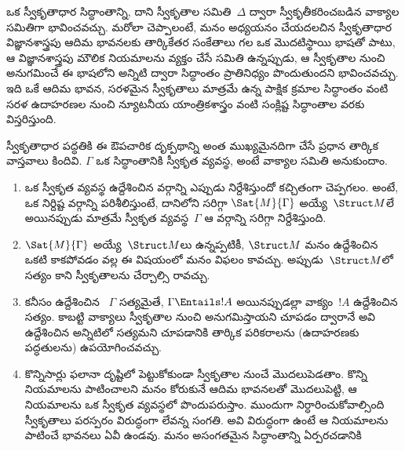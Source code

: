\documentclass[../../../include/open-logic-section]{subfiles}
\begin{document}
\begin{explain}
ఒక స్వీకృతాధార సిద్ధాంతాన్ని, దాని స్వీకృతాల సమితి~$\Delta$ ద్వారా
స్వీకృతీకరించబడిన వాక్యాల సమితిగా భావించవచ్చు. మరోలా చెప్పాలంటే, మనం
అధ్యయనం చేయదలచిన స్వీకృతాధార విజ్ఞానశాస్త్రపు ఆదిమ భావనలకు తార్కికేతర
సంకేతాలు గల ఒక మొదటిస్థాయి భాషతో పాటు, ఆ విజ్ఞానశాస్త్రపు మౌలిక నియమాలను
వ్యక్తం చేసే  సమితి ఉన్నప్పుడు, ఆ స్వీకృతాల నుంచి అనుగమించే ఈ
భాషలోని  అన్నిటి ద్వారా సిద్ధాంతం ప్రాతినిధ్యం పొందుతుందని
భావించవచ్చు. ఇది ఒకే ఆదిమ భావన, సరళమైన స్వీకృతాలు మాత్రమే ఉన్న పాక్షిక
క్రమాల సిద్ధాంతం వంటి సరళ ఉదాహరణల నుంచి న్యూటనీయ యాంత్రికశాస్త్రం వంటి
సంక్లిష్ట సిద్ధాంతాల వరకు విస్తరిస్తుంది.

స్వీకృతాధార పద్ధతికి ఈ ఔపచారిక దృక్పథాన్ని అంత ముఖ్యమైనదిగా చేసే ప్రధాన
తార్కిక వాస్తవాలు కిందివి. $\Gamma$ ఒక సిద్ధాంతానికి స్వీకృత వ్యవస్థ,
అంటే వాక్యాల సమితి అనుకుందాం.
\begin{enumerate}
\item ఒక స్వీకృత వ్యవస్థ ఉద్దేశించిన  వర్గాన్ని ఎప్పుడు
  నిర్దేశిస్తుందో కచ్చితంగా చెప్పగలం. అంటే, ఒక నిర్దిష్ట 
  వర్గాన్ని పరిశీలిస్తుంటే, దానిలోని  సరిగ్గా
  $\Sat{M}{\Gamma}$ అయ్యే~$\Struct M$లే అయినప్పుడు మాత్రమే స్వీకృత
  వ్యవస్థ~$\Gamma$ ఆ వర్గాన్ని సరిగ్గా నిర్దేశిస్తుంది.
\item $\Sat{M}{\Gamma}$ అయ్యే~$\Struct M$లు ఉన్నప్పటికీ, $\Struct M$
  మనం ఉద్దేశించిన  ఒకటి కాకపోవడం వల్ల ఈ విషయంలో మనం
  విఫలం కావచ్చు. అప్పుడు~$\Struct M$లో సత్యం కాని స్వీకృతాలను చేర్చాల్సి
  రావచ్చు.
\item కనీసం ఉద్దేశించిన ~$\Gamma$ సత్యమైతే,
  $\Gamma \Entails !A$ అయినప్పుడల్లా
  వాక్యం~$!A$ ఉద్దేశించిన  సత్యం. కాబట్టి
  వాక్యాలు స్వీకృతాల నుంచి అనుగమిస్తాయని చూపడం ద్వారానే అవి ఉద్దేశించిన
   అన్నిటిలో సత్యమని చూపడానికి తార్కిక పరికరాలను
  (ఉదాహరణకు  పద్ధతులను) ఉపయోగించవచ్చు.
\item కొన్నిసార్లు ఫలానా  దృష్టిలో పెట్టుకోకుండా
  స్వీకృతాల నుంచే మొదలుపెడతాం. కొన్ని నియమాలను పాటించాలని మనం
  కోరుకునే ఆదిమ భావనలతో మొదలుపెట్టి, ఆ నియమాలను ఒక స్వీకృత వ్యవస్థలో
  పొందుపరుస్తాం. ముందుగా నిర్ధారించుకోవాల్సింది స్వీకృతాలు
  పరస్పరం విరుద్ధంగా లేవన్న సంగతి. అవి విరుద్ధంగా ఉంటే ఆ నియమాలను పాటించే
  భావనలు ఏవీ ఉండవు. మనం అసంగతమైన సిద్ధాంతాన్ని ఏర్పరచడానికి

\end{enumerate}
\end{explain}
\end{document}
